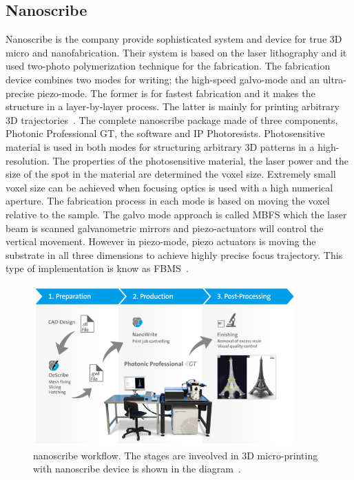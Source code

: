 \documentclass[12pt,a4paper,titlepage]{report}
\begin{document}

\subsection{Nanoscribe}\label{nanoscribe}

Nanoscribe is the company provide sophisticated system and device for true 3D
 micro and nanofabrication. Their system is based on the laser lithography and it 
used two-photo polymerization technique for the fabrication. The fabrication device combines 
two modes for writing; the high-speed galvo-mode and an ultra-precise piezo-mode. The former 
is for fastest fabrication and it makes the structure in a layer-by-layer process. The latter is mainly for
 printing arbitrary 3D trajectories~\citep{Doe:2014Feb:Online}. The complete nanoscribe 
package made of three components, Photonic Professional GT, the software and IP Photoresists. 
Photosensitive material is used in both modes for structuring arbitrary 3D patterns in a high-resolution. 
The properties of the photosensitive material, the laser power and the size of the spot in the material are
 determined the voxel size. Extremely small voxel size can be achieved when focusing optics is used with 
a high numerical aperture. The fabrication process in each mode is based on moving the voxel relative to
 the sample. The galvo mode approach is called \ac*{MBFS} which the laser beam is scanned 
galvanometric mirrors and piezo-actuators will control the vertical movement. However in 
piezo-mode, piezo actuators is moving the substrate in all three dimensions to achieve highly 
precise focus trajectory. This type of implementation is know as \ac*{FBMS}~\citep{Doe:2014Feb:Online}.




\begin{figure}
  \centering
    \includegraphics[width=0.9\textwidth]{nanoscribeWorkflow}
  \caption{nanoscribe workflow. The stages are inveolved in  3D micro-printing with nanoscribe
 device is shown in the diagram~\citep{Doe:2014Feb:Online}.}
  \label{nanoscribeWorkflow}
\end{figure}
\end{document}
